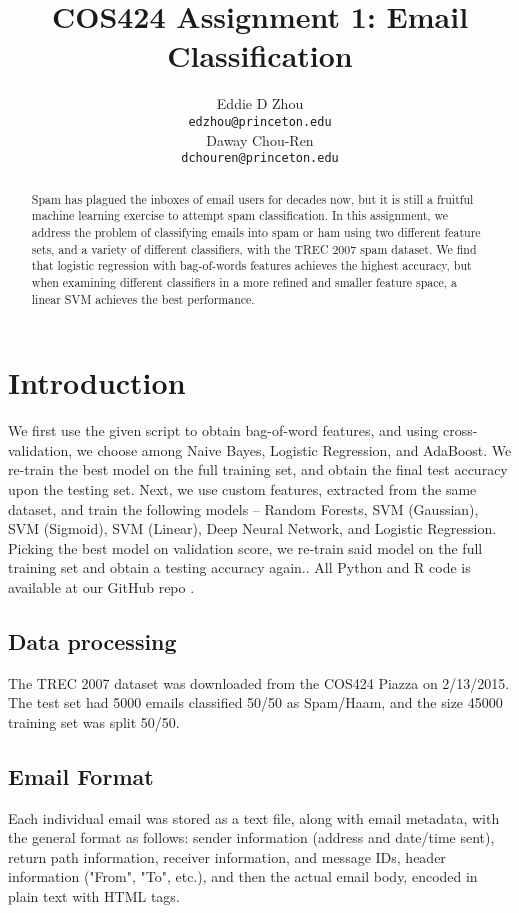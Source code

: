 \documentclass{article} %
\title{COS424 Assignment 1: Email Classification}
\author{
Eddie D Zhou\\
\texttt{edzhou@princeton.edu} \\
\And
Daway Chou-Ren\\
\texttt{dchouren@princeton.edu} \\
}
\begin{document}
\maketitle

\begin{abstract}
Spam has plagued the inboxes of email users for decades now, but it is still a fruitful machine learning exercise to attempt spam classification.  In this assignment, we address the problem of classifying emails into spam or ham using two different feature sets, and a variety of different classifiers, with the TREC 2007 spam dataset.  We find that logistic regression with bag-of-words features achieves the highest accuracy, but when examining different classifiers in a more refined and smaller feature space, a linear SVM achieves the best performance.
\end{abstract}
\section{Introduction}
We first use the given script to obtain bag-of-word features, and using cross-validation, we choose among Naive Bayes, Logistic Regression, and AdaBoost.  We re-train the best model on the full training set, and obtain the final test accuracy upon the testing set.  Next, we use custom features, extracted from the same dataset, and train the following models -- Random Forests, SVM (Gaussian), SVM (Sigmoid), SVM (Linear), Deep Neural Network, and Logistic Regression.  Picking the best model on validation score, we re-train said model on the full training set and obtain a testing accuracy again.\cite{guzella2009review, hastie2009elements}.  All Python and R code is available at our GitHub repo \cite{gh}.
\subsection{Data processing}
The TREC 2007 dataset was downloaded from the COS424 Piazza on 2/13/2015.  \cite{dataset} The test set had 5000 emails classified 50/50 as Spam/Haam, and the size 45000 training set was split 50/50.
\subsection*{Email Format}
Each individual email was stored as a text file, along with email metadata, with the general format as follows: sender information (address and date/time sent), return path information, receiver information, and message IDs, header information ("From", "To", etc.), and then the actual email body, encoded in plain text with HTML tags.
\end{document}
